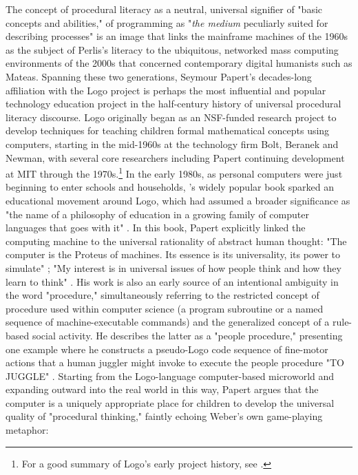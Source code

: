 The concept of procedural literacy as a neutral, universal signifier of "basic concepts and abilities," of programming as "\emph{the medium} peculiarly suited for describing processes" is an image that links the mainframe machines of the 1960s as the subject of Perlis's literacy to the ubiquitous, networked mass computing environments of the 2000s that concerned contemporary digital humanists such as Mateas. Spanning these two generations, Seymour Papert's decades-long affiliation with the Logo project is perhaps the most influential and popular technology education project in the half-century history of universal procedural literacy discourse. Logo originally began as an NSF-funded research project to develop techniques for teaching children formal mathematical concepts using computers, starting in the mid-1960s at the technology firm Bolt, Beranek and Newman, with several core researchers including Papert continuing development at MIT through the 1970s.\footnote{ For a good summary of Logo's early project history, see \autocite{Logohistory1999}.} In the early 1980s, as personal computers were just beginning to enter schools and households, \citeauthor{Papert80}'s widely popular book  sparked an educational movement around Logo, which had assumed a broader significance as "the name of a philosophy of education in a growing family of computer languages that goes with it" \autocite[217]{Papert80}. In this book, Papert explicitly linked the computing machine to the universal rationality of abstract human thought: "The computer is the Proteus of machines. Its essence is its universality, its power to simulate" \autocite[viii]{Papert80}; "My interest is in universal issues of how people think and how they learn to think" \autocite[10]{Papert80}. His work is also an early source of an intentional ambiguity in the word "procedure," simultaneously referring to the restricted concept of procedure used within computer science (a program subroutine or a named sequence of machine-executable commands) and the generalized concept of a rule-based social activity. He describes the latter as a "people procedure," presenting one example where he constructs a pseudo-Logo code sequence of fine-motor actions that a human juggler might invoke to execute the people procedure "TO JUGGLE" \autocite[107]{Papert80}. Starting from the Logo-language computer-based microworld and expanding outward into the real world in this way, Papert argues that the computer is a uniquely appropriate place for children to develop the universal quality of "procedural thinking," faintly echoing Weber's own game-playing metaphor:
